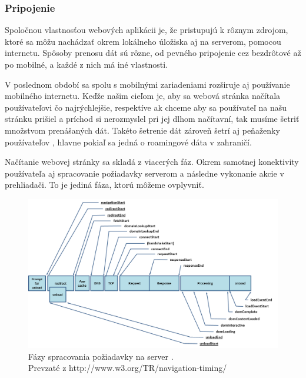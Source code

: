 
\newpage
\subsubsection{Pripojenie} %
\label{ssub:pripojenie}

Spoločnou vlastnosťou webových aplikácii je, že pristupujú k rôznym zdrojom, ktoré sa môžu nachádzať okrem lokálneho úložiska aj na serverom, pomocou internetu. Spôsoby prenosu dát sú rôzne, od pevného pripojenie cez bezdrôtové až po mobilné, a každé z nich má iné vlastnosti.

V poslednom období sa spolu s mobilnými zariadeniami rozširuje aj používanie mobilného internetu. Keďže našim cieľom je, aby sa webová stránka načítala používateľovi čo najrýchlejšie, respektíve ak chceme aby sa používateľ na našu stránku prišiel a príchod si nerozmyslel pri jej dlhom načítavní, tak musíme šetriť množstvom prenášaných dát. Takéto šetrenie dát zároveň šetrí aj peňaženky používateľov \cite{performance}, hlavne pokiaľ sa jedná o roamingové dáta v zahraničí.

Načítanie webovej stránky sa skladá z viacerých fáz. Okrem samotnej konektivity používateľa aj spracovanie požiadavky serverom a následne vykonanie akcie v prehliadači. To je jediná fáza, ktorú môžeme ovplyvniť.

\begin{figure}[H]
	\centering
	\includegraphics[width=1.0\textwidth]{img/w3c-timing-overview.png}
	\caption[Fázy spracovania požiadavky na server]{
		Fázy spracovania požiadavky na server \cite{timing}.\\
		Prevzaté z http://www.w3.org/TR/navigation-timing/}
	\label{fig: timing}
\end{figure}

